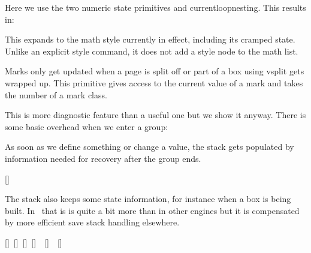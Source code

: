 \typebuffer

Here we use the two numeric state primitives  and \prm
{currentloopnesting}. This results in:

\getbuffer

\stopnewprimitive

\startnewprimitive[title={\prm {currentlysetmathstyle}}]

This expands to the math style currently in effect, including its cramped state.
Unlike an explicit style command, it does not add a style node to the math list.

\stopnewprimitive

\startnewprimitive[title={\prm {currentmarks}}]

Marks only get updated when a page is split off or part of a box using \prm
{vsplit} gets wrapped up. This primitive gives access to the current value of a
mark and takes the number of a mark class.

\stopnewprimitive

\startoldprimitive[title={\prm {currentstacksize}}]

This is more diagnostic feature than a useful one but we show it anyway. There is
some basic overhead when we enter a group:

\startbuffer
\bgroup [\the\currentstacksize]
    \bgroup [\the\currentstacksize]
        \bgroup [\the\currentstacksize]
        [\the\currentstacksize] \egroup
    [\the\currentstacksize] \egroup
[\the\currentstacksize] \egroup
\stopbuffer

\typebuffer \getbuffer

As soon as we define something or change a value, the stack gets populated by
information needed for recovery after the group ends.

\startbuffer
\bgroup [\the\currentstacksize]
    \bgroup [\the\currentstacksize]
        \scratchdimen 1pt
        \scratchdimen 2pt
        \bgroup [\the\currentstacksize]
        [\the\currentstacksize] \egroup
    [\the\currentstacksize] \egroup
[\the\currentstacksize] \egroup
\stopbuffer

\typebuffer \getbuffer

The stack also keeps some state information, for instance when a box is being
built. In \LUAMETATEX\ that is is quite a bit more than in other engines but it
is compensated by more efficient save stack handling elsewhere.

\startbuffer
\hbox \bgroup [\the\currentstacksize]
    \hbox \bgroup [\the\currentstacksize]
        \hbox \bgroup [\the\currentstacksize]
        [\the\currentstacksize] \egroup
    [\the\currentstacksize] \egroup
[\the\currentstacksize] \egroup
\stopbuffer

